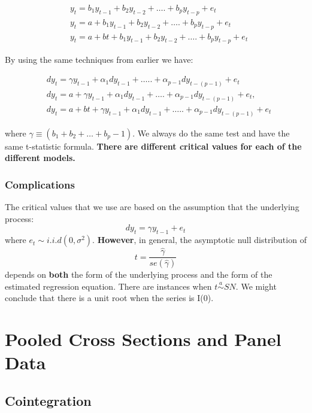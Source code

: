 \documentclass[11pt]{article}
\begin{document}
\begin{equation}
\begin{aligned}
& y_t=b_1 y_{t-1}+b_2 y_{t-2}+\ldots .+b_p y_{t-p}+e_t \\
& y_t=a+b_1 y_{t-1}+b_2 y_{t-2}+\ldots .+b_p y_{t-p}+e_t \\
& y_t=a+b t+b_1 y_{t-1}+b_2 y_{t-2}+\ldots .+b_p y_{t-p}+e_t
\end{aligned}
\end{equation}

By using the same techniques from earlier we have:

\begin{equation}
\begin{aligned}
& d y_t=\gamma y_{t-1}+\alpha_1 d y_{t-1}+\ldots . .+\alpha_{p-1} d y_{t-(p-1)}+e_t \\
& d y_t=a+\gamma y_{t-1}+\alpha_1 d y_{t-1}+\ldots .+\alpha_{p-1} d y_{t-(p-1)}+e_t, \\
& d y_t=a+b t+\gamma y_{t-1}+\alpha_1 d y_{t-1}+\ldots . .+\alpha_{p-1} d y_{t-(p-1)}+e_t
\end{aligned}
\end{equation}

where $\gamma \equiv (b_1 + b_2 + \ldots + b_p -1)$. We always do the same test and have the same t-statistic formula. \textbf{There are different critical values for each of the different models.}


\subsubsection{Complications}

The critical values that we use are based on the assumption that the underlying process:
\[dy_t = \gamma y_{t-1} + e_t\]
where $e_t \sim i.i.d(0,\sigma^2)$. \textbf{However}, in general, the asymptotic null distribution of 
\[t=\dfrac{\hat{\gamma}}{se(\hat{\gamma})}\]
depends on \textbf{both} the form of the underlying process and the form of the estimated regression equation. There are instances when $t \overset{a}{\sim} SN$. We might conclude that there is a unit root when the series is I(0).


\section{Pooled Cross Sections and Panel Data}


\subsection{Cointegration}
\end{document}
